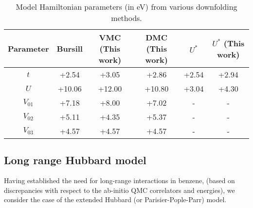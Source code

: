 \documentclass[aip,jcp,twocolumn,10pt]{revtex4-1}
\begin{document}
\begin{table*}[htpb]
\label{tab:param}
\begin{center}
\begin{tabular}{|c|c|c|c|c|c|}
\hline
Parameter  &  Bursill           &  VMC (This work) &  DMC (This work)  & $U^{*}$    &  $U^{*}$ (This work) \tabularnewline
\hline						   
\hline						   
 $t$        &   +2.54            &   +3.05	   &   +2.86            &  +2.54      &  +2.94   \tabularnewline
\hline						   
 $U$       &    +10.06           &   +12.00	   &   +10.80           &  +3.04      &  +4.30 \tabularnewline
\hline						   
 $V_{01}$  &    +7.18            &   +8.00	   &   +7.02            &   -         &    -    \tabularnewline
\hline						   
 $V_{02}$  &    +5.11            &   +4.35	   &   +5.37            &   -         &    -    \tabularnewline
\hline						   
 $V_{03}$  &    +4.57            &   +4.57	   &   +4.57            &   -         &    -    \tabularnewline
\hline
\hline
\end{tabular}
\caption{Model Hamiltonian parameters (in eV) from various downfolding methods.}
\end{center}
\end{table*}

\subsection {Long range Hubbard model}
Having established the need for long-range interactions in benzene,
(based on discrepancies with respect to the ab-initio QMC correlators and energies),
we consider the case of the extended Hubbard (or Parisier-Pople-Parr) model.
\end{document}
